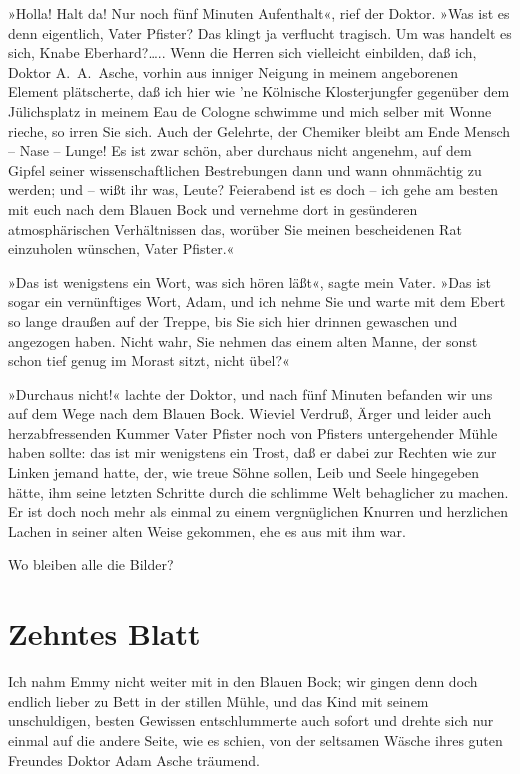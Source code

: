 »Holla! Halt da! Nur noch fünf Minuten Aufenthalt«, rief der
Doktor. »Was ist es denn eigentlich, Vater Pfister? Das klingt ja
verflucht tragisch. Um was handelt es sich, Knabe Eberhard?\ldots{}..
Wenn die Herren sich vielleicht einbilden, daß ich, Doktor
A.~A.~Asche, vorhin aus inniger Neigung in meinem angeborenen
Element plätscherte, daß ich hier wie 'ne Kölnische Klosterjungfer
gegenüber dem Jülichsplatz in meinem Eau de Cologne schwimme und
mich selber mit Wonne rieche, so irren Sie sich. Auch der Gelehrte,
der Chemiker bleibt am Ende Mensch – Nase – Lunge! Es ist zwar
schön, aber durchaus nicht angenehm, auf dem Gipfel seiner
wissenschaftlichen Bestrebungen dann und wann ohnmächtig zu werden;
und – wißt ihr was, Leute? Feierabend ist es doch – ich gehe am
besten mit euch nach dem Blauen Bock und vernehme dort in
gesünderen atmosphärischen Verhältnissen das, worüber Sie meinen
bescheidenen Rat einzuholen wünschen, Vater Pfister.«

»Das ist wenigstens ein Wort, was sich hören läßt«, sagte mein
Vater. »Das ist sogar ein vernünftiges Wort, Adam, und ich nehme
Sie und warte mit dem Ebert so lange draußen auf der Treppe, bis
Sie sich hier drinnen gewaschen und angezogen haben. Nicht wahr,
Sie nehmen das einem alten Manne, der sonst schon tief genug im
Morast sitzt, nicht übel?«

»Durchaus nicht!« lachte der Doktor, und nach fünf Minuten befanden
wir uns auf dem Wege nach dem Blauen Bock. Wieviel Verdruß, Ärger
und leider auch herzabfressenden Kummer Vater Pfister noch von
Pfisters untergehender Mühle haben sollte: das ist mir wenigstens
ein Trost, daß er dabei zur Rechten wie zur Linken jemand hatte,
der, wie treue Söhne sollen, Leib und Seele hingegeben hätte, ihm
seine letzten Schritte durch die schlimme Welt behaglicher zu
machen. Er ist doch noch mehr als einmal zu einem vergnüglichen
Knurren und herzlichen Lachen in seiner alten Weise gekommen, ehe
es aus mit ihm war.

Wo bleiben alle die Bilder?

\section{Zehntes Blatt}

Ich nahm Emmy nicht weiter mit in den Blauen Bock; wir gingen denn
doch endlich lieber zu Bett in der stillen Mühle, und das Kind mit
seinem unschuldigen, besten Gewissen entschlummerte auch sofort und
drehte sich nur einmal auf die andere Seite, wie es schien, von der
seltsamen Wäsche ihres guten Freundes Doktor Adam Asche träumend.

